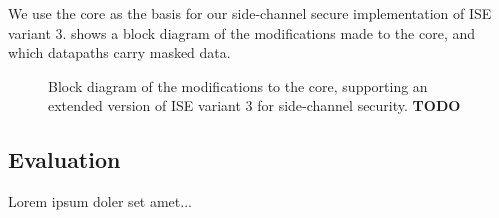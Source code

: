 We use the  core as the basis for our side-channel secure
implementation of ISE variant $3$.
 shows a block diagram of the modifications
made to the core, and which datapaths carry masked data.

\begin{figure}
\caption{Block diagram of the modifications to the  core,
supporting an extended version of ISE variant $3$ for side-channel
security. {\bf TODO}}
\label{fig:sca:uarch}
\end{figure}


\subsection{Evaluation}

Lorem ipsum doler set amet...

